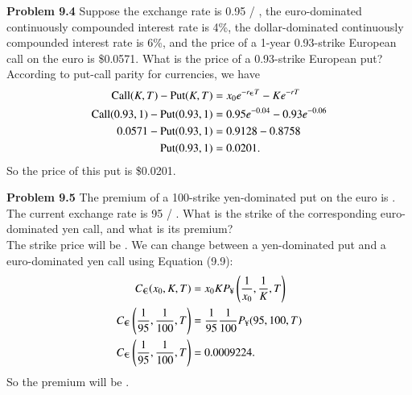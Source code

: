 \documentclass[12pt]{article}
\newcommand{\problem}[1]{\bigskip \noindent \textbf{Problem #1}}
\newcommand{\Call}{\text{Call}}
\newcommand{\Put}{\text{Put}}
\newcommand{\euro}{\text{\texteuro}}
\newcommand{\y}{\text{\textyen}}
\theoremstyle{plain}
\begin{document}
\problem{9.4} Suppose the exchange rate is 0.95 \textdollar / \texteuro, the euro-dominated continuously compounded interest rate is 4\%, the dollar-dominated continuously compounded interest rate is 6\%, and the price of a 1-year 0.93-strike European call on the euro is \$0.0571. What is the price of a 0.93-strike European put?\\

According to put-call parity for currencies, we have
\begin{align*}
\Call(K,T) - \Put(K,T) &= x_0 e^{-r_{\text{\texteuro}}T} - Ke^{-rT}\\
\Call(0.93,1) - \Put(0.93,1) &= 0.95 e^{-0.04} - 0.93 e^{-0.06}\\
0.0571 - \Put(0.93,1) &= 0.9128 - 0.8758\\
\Put(0.93,1) &= 0.0201.
\end{align*}
So the price of this put is \$0.0201.

\problem{9.5} The premium of a 100-strike yen-dominated put on the euro is . The current exchange rate is 95 \textyen / \texteuro. What is the strike of the corresponding euro-dominated yen call, and what is its premium?\\

The strike price will be . We can change between a yen-dominated put and a euro-dominated yen call using Equation (9.9):
\begin{align*}
C_{\euro}(x_0, K, T) &= x_0 K P_{\y}\left(\frac{1}{x_0}, \frac{1}{K}, T\right)\\
C_{\euro}\left(\frac{1}{95}, \frac{1}{100}, T\right) &= \frac{1}{95} \frac{1}{100} P_{\y}(95,100,T)\\
C_{\euro}\left(\frac{1}{95}, \frac{1}{100}, T\right) &= 0.0009224.
\end{align*}
So the premium will be .
\end{document}
